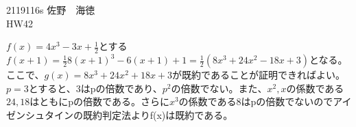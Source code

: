 \documentclass[11pt]{jsarticle}
\begin{document}
2119116s 佐野　海徳\\
HW42
\par$f(x) = 4x^3 - 3x + \frac{1}{2}$とする$f(x + 1) = \frac{1}{2}{8(x + 1)^3 -6(x + 1) + 1} = \frac{1}{2}(8x^3 + 24x^2-18x + 3)$となる。ここで、$g(x) = 8x^3 + 24x^2 + 18x + 3$が既約であることが証明できればよい。
$p = 3$とすると、3はpの倍数であり、$p^2$の倍数でない。また、$x^2,x$の係数である$24,18$はともにpの倍数である。さらに$x^3$の係数である8はpの倍数でないのでアイゼンシュタインの既約判定法よりf(x)は既約である。
\end{document}
